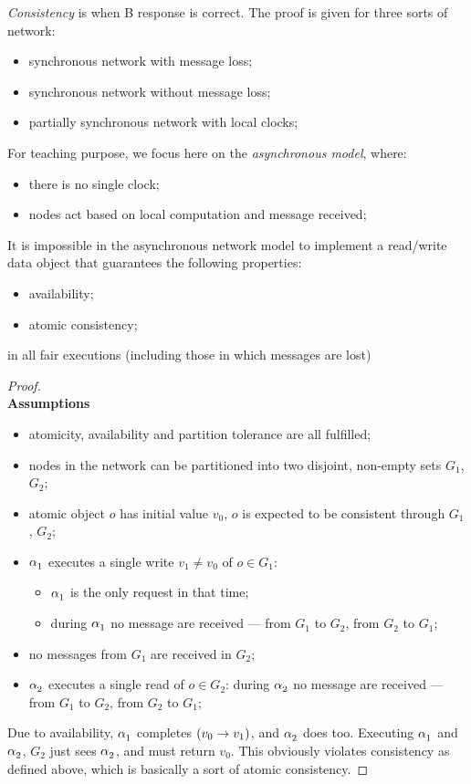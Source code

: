 \documentclass[11pt, a4paper]{article}
\begin{document}
\textit{Consistency} is when B response is correct.
\emptyln{}
The proof is given for three sorts of network:
\begin{itemize}
    \item synchronous network with message loss;
    \item synchronous network without message loss;
    \item partially synchronous network with local clocks;
\end{itemize}
For teaching purpose, we focus here on the \textit{asynchronous model}, where:
\begin{itemize}
    \item there is no single clock;
    \item nodes act based on local computation and message received;
\end{itemize}
\begin{theorem}{}{}
    It is impossible in the asynchronous network model to implement a read/write data object that guarantees the following properties:
    \begin{itemize}
        \item availability;
        \item atomic consistency;
    \end{itemize}
    in all fair executions (including those in which messages are lost)
    \begin{proof}
        \\
        \textbf{Assumptions}
        \begin{itemize}
            \item atomicity, availability and partition tolerance are all fulfilled;
            \item nodes in the network can be partitioned into two disjoint, non-empty sets $G_1$, $G_2$;
            \item atomic object $o$ has initial value $v_0$, $o$ is expected to be consistent through $G_1$, $G_2$;
            \item ${\alpha}^{}_1$ executes a single write $v_1 \neq v_0$ of $o \in G_1$:
                \begin{itemize}
                    \item ${\alpha}^{}_1$ is the only request in that time;
                    \item during ${\alpha}^{}_1$ no message are received --- from $G_1$ to $G_2$, from $G_2$ to $G_1$;
                \end{itemize}
            \item no messages from $G_1$ are received in $G_2$;
            \item ${\alpha}^{}_2$ executes a single read of $o \in G_2$: during ${\alpha}^{}_2$ no message are received --- from $G_1$ to $G_2$, from $G_2$ to $G_1$;
        \end{itemize}
        Due to availability, ${\alpha}^{}_1$ completes $\left({v_0 \to v_1}\right)$, and ${\alpha}^{}_2$ does too.
        Executing ${\alpha}^{}_1$ and ${\alpha}^{}_2$, $G_2$ just sees ${\alpha}^{}_2$, and must return $v_0$.
        \emptyln{}
        This obviously violates consistency as defined above, which is basically a sort of atomic consistency.
    \end{proof}
\end{theorem}
%
\end{document}
